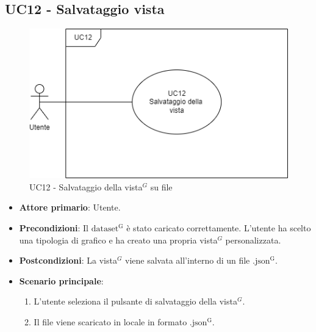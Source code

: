 \subsection{UC12 - Salvataggio vista}
\label{sec:UC12}
\begin{figure}[h!]
    \centering
    \includegraphics[scale=0.60]{../../assets/salvataggio_vista.png}
    \caption{UC12 - Salvataggio della vista$^{G}$ su file}
\end{figure}
\begin{itemize}
    \item \textbf{Attore primario}: Utente.
    \item \textbf{Precondizioni}: Il ${\mathrm{dataset^{G}}}$ è stato caricato correttamente. L'utente ha scelto una tipologia di grafico e ha creato una propria vista$^{G}$ personalizzata.
    \item \textbf{Postcondizioni}: La vista$^{G}$ viene salvata all'interno di un file ${\mathrm{.json^{G}}}$.
    \item \textbf{Scenario principale}:
          \begin{enumerate}
              \item L'utente seleziona il pulsante di salvataggio della vista$^{G}$.
              \item Il file viene scaricato in locale in formato ${\mathrm{.json^{G}}}$.
          \end{enumerate}
\end{itemize}

\newpage


